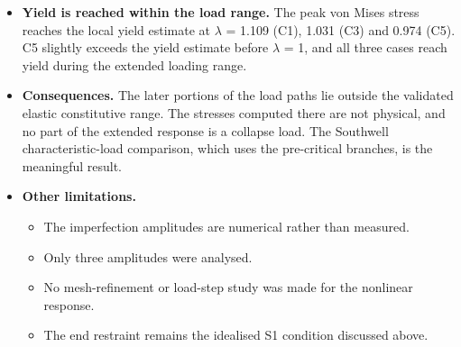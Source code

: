 \begin{itemize}
\item \textbf{Yield is reached within the load range.} The peak von Mises stress reaches the local yield estimate at $\lambda$ = 1.109
      (C1), 1.031 (C3) and 0.974 (C5). C5 slightly exceeds the yield estimate before $\lambda$ = 1, and all three cases reach yield during
      the extended loading range.
\item \textbf{Consequences.} The later portions of the load paths lie outside the validated elastic constitutive range. The stresses
      computed there are not physical, and no part of the extended response is a collapse load. The Southwell characteristic-load
      comparison, which uses the pre-critical branches, is the meaningful result.
\item \textbf{Other limitations.}
      \begin{itemize}
      \item The imperfection amplitudes are numerical rather than measured.
      \item Only three amplitudes were analysed.
      \item No mesh-refinement or load-step study was made for the nonlinear response.
      \item The end restraint remains the idealised S1 condition discussed above.
      \end{itemize}
\end{itemize}
\FloatBarrier
